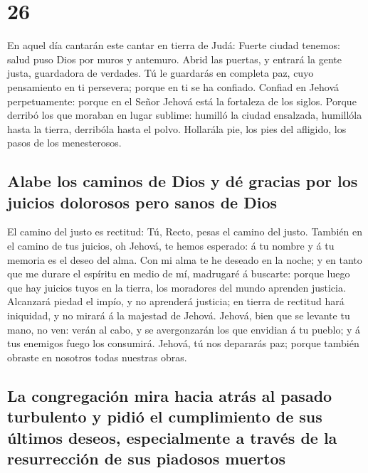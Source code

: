 \hypertarget{section-25}{%
\section{26}\label{section-25}}

 En aquel día cantarán este cantar en tierra de Judá: Fuerte
ciudad tenemos: salud puso Dios por muros y antemuro.  Abrid
las puertas, y entrará la gente justa, guardadora de verdades.
 Tú le guardarás en completa paz, cuyo pensamiento en ti
persevera; porque en ti se ha confiado.  Confiad en Jehová
perpetuamente: porque en el Señor Jehová está la fortaleza de los
siglos.  Porque derribó los que moraban en lugar sublime:
humilló la ciudad ensalzada, humillóla hasta la tierra, derribóla hasta
el polvo.  Hollarála pie, los pies del afligido, los pasos
de los menesterosos.

\hypertarget{alabe-los-caminos-de-dios-y-duxe9-gracias-por-los-juicios-dolorosos-pero-sanos-de-dios}{%
\subsection{Alabe los caminos de Dios y dé gracias por los juicios
dolorosos pero sanos de
Dios}\label{alabe-los-caminos-de-dios-y-duxe9-gracias-por-los-juicios-dolorosos-pero-sanos-de-dios}}

 El camino del justo es rectitud: Tú, Recto, pesas el camino
del justo.  También en el camino de tus juicios, oh Jehová,
te hemos esperado: á tu nombre y á tu memoria es el deseo del alma.
 Con mi alma te he deseado en la noche; y en tanto que me
durare el espíritu en medio de mí, madrugaré á buscarte: porque luego
que hay juicios tuyos en la tierra, los moradores del mundo aprenden
justicia.  Alcanzará piedad el impío, y no aprenderá
justicia; en tierra de rectitud hará iniquidad, y no mirará á la
majestad de Jehová.  Jehová, bien que se levante tu mano,
no ven: verán al cabo, y se avergonzarán los que envidian á tu pueblo; y
á tus enemigos fuego los consumirá.  Jehová, tú nos
depararás paz; porque también obraste en nosotros todas nuestras obras.

\hypertarget{la-congregaciuxf3n-mira-hacia-atruxe1s-al-pasado-turbulento-y-pidiuxf3-el-cumplimiento-de-sus-uxfaltimos-deseos-especialmente-a-travuxe9s-de-la-resurrecciuxf3n-de-sus-piadosos-muertos}{%
\subsection{La congregación mira hacia atrás al pasado turbulento y
pidió el cumplimiento de sus últimos deseos, especialmente a través de
la resurrección de sus piadosos
muertos}\label{la-congregaciuxf3n-mira-hacia-atruxe1s-al-pasado-turbulento-y-pidiuxf3-el-cumplimiento-de-sus-uxfaltimos-deseos-especialmente-a-travuxe9s-de-la-resurrecciuxf3n-de-sus-piadosos-muertos}}

